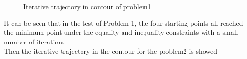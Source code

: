 \begin{figure}[H]
{}
\quad
{}
\caption{ Iterative trajectory in contour of problem1}

\end{figure}
It can be seen that in the test of Problem 1, the four starting  points all reached the minimum point under the equality and inequality constraints with a small number of iterations.\\
Then the iterative trajectory in the contour for the problem2 is showed 
\vspace{-0.3cm}
